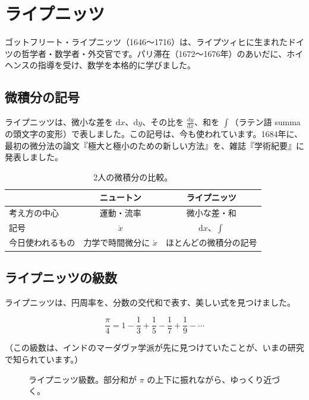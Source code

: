 \documentclass[a4paper,11pt,openany]{ltjsbook}
\newcommand{\dd}{\mathrm{d}}
\begin{document}
\section{ライプニッツ}

ゴットフリート・ライプニッツ（1646〜1716）は、ライプツィヒに生まれたドイツの哲学者・数学者・外交官です。パリ滞在（1672〜1676年）のあいだに、ホイヘンスの指導を受け、数学を本格的に学びました。

\subsection{微積分の記号}

ライプニッツは、微小な差を $\dd x$、$\dd y$、その比を $\tfrac{\dd y}{\dd x}$、和を $\displaystyle\int$（ラテン語 summa の頭文字の変形）で表しました。この記号は、今も使われています。1684年に、最初の微分法の論文『極大と極小のための新しい方法』を、雑誌『学術紀要』に発表しました。

\begin{table}[htbp]
\centering
\begin{tabular}{lcc}
\toprule
 & ニュートン & ライプニッツ\\
\midrule
考え方の中心 & 運動・流率 & 微小な差・和\\
記号 & $\dot x$ & $\dd x$、$\displaystyle\int$\\
今日使われるもの & 力学で時間微分に $\dot x$ & ほとんどの微積分の記号\\
\bottomrule
\end{tabular}
\caption{2人の微積分の比較。}
\end{table}

\subsection{ライプニッツの級数}

ライプニッツは、円周率を、分数の交代和で表す、美しい式を見つけました。

\[
\frac{\pi}{4}=1-\frac13+\frac15-\frac17+\frac19-\cdots
\]

（この級数は、インドのマーダヴァ学派が先に見つけていたことが、いまの研究で知られています。）

\begin{figure}[htbp]
\centering
{}
\caption{ライプニッツ級数。部分和が $\pi$ の上下に振れながら、ゆっくり近づく。}
\end{figure}
\end{document}
